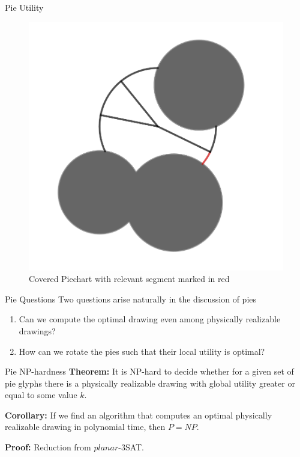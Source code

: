 \documentclass{beamer}
\begin{document}
\begin{frame}{Pie Utility}
  
  \begin{figure}[h]
    \centering
      \includegraphics[width=0.5\linewidth]{assets/piecharts_utility.png}
      \caption{Covered Piechart with relevant segment marked in red}
  \end{figure}
\end{frame}

\begin{frame}{Pie Questions}
    Two questions arise naturally in the discussion of pies
    \begin{enumerate}
        \item Can we compute the optimal drawing even among physically realizable drawings?
        \item How can we rotate the pies such that their local utility is optimal?
    \end{enumerate}
\end{frame}

\begin{frame}{Pie NP-hardness}
  \textbf{Theorem:} It is NP-hard to decide whether for a given set of pie glyphs there is a physically realizable drawing with global utility greater or equal to some value $k$.
  
  \textbf{Corollary:} If we find an algorithm that computes an optimal physically realizable drawing in polynomial time, then $P=NP$.
  
  \textbf{Proof:} Reduction from $planar$-3SAT.
\end{frame}
\end{document}

